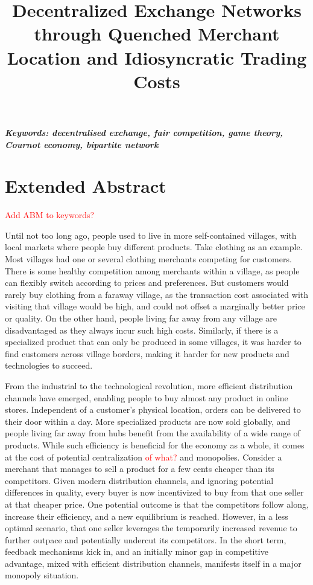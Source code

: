 \documentclass[a4paper,12pt]{article}
\title{Decentralized Exchange Networks through Quenched Merchant Location and Idiosyncratic Trading Costs}
\author[]{} %
\date{}
\newcommand{\red}[1]{\textcolor{red}{#1}} %
\begin{document}
\maketitle
\thispagestyle{fancy}

\vspace{-6em}
\begin{center}
\textbf{\textit{Keywords: decentralised exchange, fair competition, game theory, Cournot economy, bipartite network}} 
\newline
\end{center}

\section*{Extended Abstract}

\red{Add ABM to keywords?}

Until not too long ago, people used to live in more self-contained villages, with local markets where people buy different products. 
Take clothing as an example. Most villages had one or several clothing merchants competing for customers. 
There is some healthy competition among merchants within a village, as people can flexibly switch according to prices and preferences.
But customers would rarely buy clothing from a faraway village, as the transaction cost associated with visiting that village would be high, 
and could not offset a marginally better price or quality. 
On the other hand, people living far away from any village are disadvantaged as they always incur such high costs.
Similarly, if there is a specialized product that can only be produced in some villages, it was harder to find customers across village borders, 
making it harder for new products and technologies to succeed. 

From the industrial to the technological revolution, more efficient distribution channels have emerged, enabling people to buy almost any product in online stores. 
Independent of a customer's physical location, orders can be delivered to their door within a day. 
More specialized products are now sold globally, and people living far away from hubs benefit from the availability of a wide range of products. 
While such efficiency is beneficial for the economy as a whole, it comes at the
cost of potential centralization \red{of what?} and monopolies. 
Consider a merchant that manages to sell a product for a few cents cheaper than its competitors. 
Given modern distribution channels, and ignoring potential differences in quality, every buyer is now incentivized to buy from that one seller at that cheaper price.
One potential outcome is that the competitors follow along, increase their efficiency, and a new equilibrium is reached. 
However, in a less optimal scenario, that one seller leverages the temporarily increased revenue to further outpace and potentially undercut its competitors. 
In the short term, feedback mechanisms kick in, and an initially minor gap in competitive advantage, mixed with efficient distribution channels, manifests itself in a major monopoly situation. 
\end{document}
